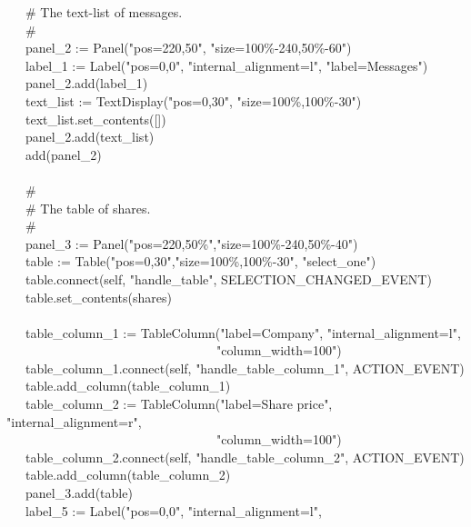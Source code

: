 {\>   \ \ \ \# The text-list of messages. \\
\>   \ \ \ \# \\
\>   \ \ \ panel\_2 := Panel("pos=220,50",
"size=100\%-240,50\%-60") \\
\>   \ \ \ label\_1 := Label("pos=0,0",
"internal\_alignment=l",
"label=Messages") \\
\>   \ \ \ panel\_2.add(label\_1) \\
\>   \ \ \ text\_list :=
TextDisplay("pos=0,30",
"size=100\%,100\%-30") \\
\>   \ \ \ text\_list.set\_contents([]) \\
\>   \ \ \ panel\_2.add(text\_list) \\
\>   \ \ \ add(panel\_2) \\
\ \\
\>   \ \ \ \# \\
\>   \ \ \ \# The table of shares. \\
\>   \ \ \ \# \\
\>   \ \ \ panel\_3 :=
Panel("pos=220,50\%","size=100\%-240,50\%-40") \\
\>   \ \ \ table :=
Table("pos=0,30","size=100\%,100\%-30",
"select\_one") \\
\>   \ \ \ table.connect(self,
"handle\_table",
SELECTION\_CHANGED\_EVENT) \\
\>   \ \ \ table.set\_contents(shares) \\
\ \\
\>   \ \ \ table\_column\_1 :=
TableColumn("label=Company",
"internal\_alignment=l", \\
\>   \ \ \ \ \ \ \ \ \ \ \ \ \ \ \ \ \ \ \ \ \ \ \ \ \ \ \ \ \ \ \ \ \ "column\_width=100") \\
\>   \ \ \ table\_column\_1.connect(self,
"handle\_table\_column\_1", ACTION\_EVENT) \\
\>   \ \ \ table.add\_column(table\_column\_1) \\
\>   \ \ \ table\_column\_2 := TableColumn("label=Share
price",
"internal\_alignment=r", \\
\>   \ \ \ \ \ \ \ \ \ \ \ \ \ \ \ \ \ \ \ \ \ \ \ \ \ \ \ \ \ \ \ \ \ "column\_width=100") \\
\>   \ \ \ table\_column\_2.connect(self,
"handle\_table\_column\_2", ACTION\_EVENT) \\
\>   \ \ \ table.add\_column(table\_column\_2) \\
\>   \ \ \ panel\_3.add(table) \\
\>   \ \ \ label\_5 := Label("pos=0,0",
"internal\_alignment=l",
}
